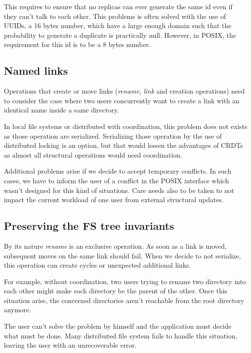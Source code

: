 \documentclass[sigplan, 10pt]{acmart}
\begin{document}
This requires to ensure that no replicas can ever generate the same id even
if they can't talk to each other. This problems is often solved with the use
of UUIDs, a 16 bytes number, which have a large enough domain such
that the probability to generate a duplicate is practically null.
However, in POSIX, the requirement for this id is to be a 8 bytes number.

\subsection{Named links}

Operations that create or move links (\textit{rename}, \textit{link}
and creation operations) need to consider the case where two users
concurrently want to create a link with an identical name
inside a same directory.

In local file systems or distributed with coordination,
this problem does not exists as those operation are serialized. Serializing
those operation by the use of distributed locking is an option, but that would
lessen the advantages of CRDTs as almost all structural operations would need
coordination.

Additional problems arise if we decide to accept temporary conflicts. In such
cases, we have to inform the user of a conflict in the POSIX interface
which wasn't designed for this kind of situations. Care needs also to be taken
to not impact the current workload of one user from external structural
updates.

\subsection{Preserving the FS tree invariants}

By its nature \textit{rename} is an exclusive operation.
As soon as a link is moved, subsequent moves on the same link should fail.
When we decide to not serialize, this operation can create cycles
or unexpected additional links.

For example, without coordination, two users trying to rename
two directory into each other might make each directory be the parent of the other.
Once this situation arise, the concerned directories aren't reachable
from the root directory anymore.

The user can't solve the problem by himself and the application must
decide what must be done. Many distributed file system fails
to handle this situation, leaving the user with an unrecoverable error.
\end{document}
